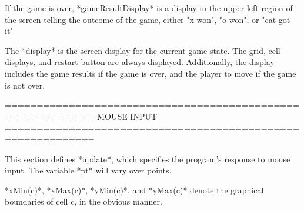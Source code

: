 \documentclass{led_doc}
\begin{document}
\begin{ledDef}
\end{ledDef}

\begin{ledCmnt}
If the game is over, *gameResultDisplay* is a display in the upper left region of the screen telling the outcome of the game, either "x won", "o won", or "cat got it"
\end{ledCmnt}

\begin{ledDef}
\end{ledDef}

\begin{ledCmnt}
The *display* is the screen display for the current game state. The grid, cell displays, and restart button are always displayed. Additionally, the display includes the game results if the game is over, and the player to move if the game is not over.
\end{ledCmnt}

\begin{ledDef}
\end{ledDef}

\begin{ledCmnt}
============================================================
MOUSE INPUT
============================================================

This section defines *update*, which specifies the program's response to mouse input. The variable *pt* will vary over points.

*xMin(c)*, *xMax(c)*, *yMin(c)*, and *yMax(c)* denote the graphical boundaries of cell c, in the obvious manner.
\end{ledCmnt}
\end{document}

